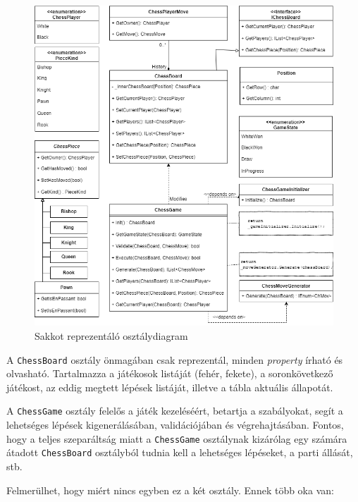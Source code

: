 \documentclass[twoside, a4paper, 12pt]{article}
\begin{document}
\begin{figure}[htbp]
	\centering
	\includegraphics[width=\textwidth]{img/chessClassDiagram.png}
	\caption{Sakkot reprezentáló osztálydiagram}
	\label{fig:chessClassDiagram}
\end{figure}

A \texttt{ChessBoard} osztály önmagában csak reprezentál, minden \textit{property} írható és olvasható. Tartalmazza a játékosok listáját (fehér, fekete), a soronkövetkező játékost, az eddig megtett lépések listáját, illetve a tábla aktuális állapotát.

A \texttt{ChessGame} osztály felelős a játék kezeléséért, betartja a szabályokat, segít a lehetséges lépések kigenerálásában, validációjában és végrehajtásában. Fontos, hogy a teljes szeparáltság miatt a \texttt{ChessGame} osztálynak kizárólag egy számára átadott \texttt{ChessBoard} osztályból tudnia kell a lehetséges lépéseket, a parti állását, stb.

Felmerülhet, hogy miért nincs egyben ez a két osztály. Ennek több oka van:
\end{document}
